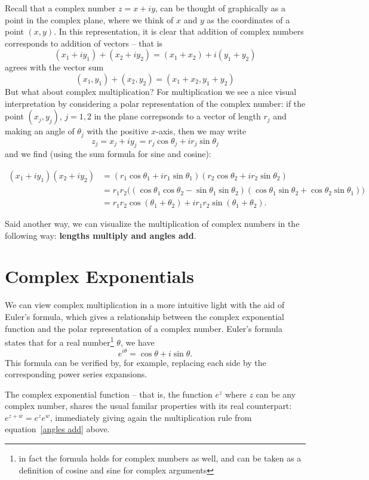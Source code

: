 \documentclass[12pt]{report}
\theoremstyle{plain}
\begin{document}
Recall that a complex number $z = x + iy$, can be thought of graphically as a point in the complex plane, where we think of $x$ and $y$ as the coordinates of a point $(x, y)$. In this representation, it is clear that addition of complex numbers corresponds to addition of vectors -- that is
\[ (x_1 + i y_1) + (x_2 + i y_2) = (x_1 + x_2) + i (y_1 + y_2)\]
agrees with the vector sum
\[ (x_1, y_1) + (x_2, y_2) = (x_1 + x_2, y_1 + y_2) \]
But what about complex multiplication? For multiplication we see a nice visual interpretation by considering a polar representation of the complex number: if the point $(x_j, y_j)$, $j = 1, 2$ in the plane correpsonds to a vector of length $r_j$ and making an angle of $\theta_j$ with the positive $x$-axis, then we may write
\[z_j = x_j + i y_j = r_j \cos \theta_j + i r_j \sin \theta_j \]
and we find (using the sum formula for sine and cosine):

\begin{align} \label{angles add}
(x_1 + i y_1)(x_2 + i y_2) &= (r_1 \cos \theta_1 + i r_1 \sin \theta_1)(r_2 \cos \theta_2 + i r_2 \sin \theta_2) \\ &= r_1 r_2 \Big( (\cos \theta_1 \cos \theta_2 - \sin \theta_1 \sin \theta_2) (\cos \theta_1 \sin \theta_2 + \cos \theta_2 \sin \theta_1 )\Big) \\ &= r_1 r_2 \cos (\theta_1 + \theta_2) + i r_1 r_2 \sin (\theta_1 + \theta_2).
\end{align}

Said another way, we can visualize the multiplication of complex numbers in the following way: \textbf{lengths multiply and angles add}.

\section{Complex Exponentials} \label{complex exponentials}

We can view complex multiplication in a more intuitive light with the aid of Euler's formula, which gives a relationship between the complex exponential function and the polar representation of a complex number. Euler's formula states that for a real number\footnote{in fact the formula holds for complex numbers as well, and can be taken as a definition of cosine and sine for complex arguments} $\theta$, we have
\[e^{i \theta} = \cos \theta + i \sin \theta. \]
This formula can be verified by, for example, replacing each side by the corresponding power series expansions.

The complex exponential function -- that is, the function $e^z$ where $z$ can be any complex number, shares the usual familar properties with its real counterpart: $e^{z + w} = e^z e^w$, immediately giving again the multiplication rule from equation~\ref{angles add} above.
\end{document}
